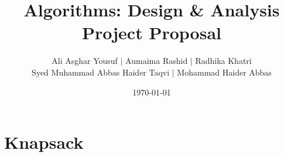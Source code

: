 \documentclass{article}
\title{Algorithms: Design \& Analysis Project Proposal}
\author{Ali Asghar Yousuf $\mid$ Aumaima Rashid $\mid$ Radhika Khatri\\
        Syed Muhammad Abbas Haider Taqvi $\mid$ Mohammad Haider Abbas
        }
\date{\today}
\begin{document}
\maketitle

\section{Knapsack}
\end{document}
